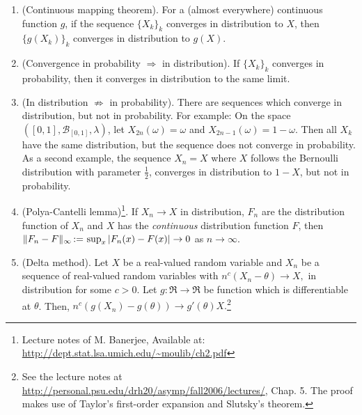 \documentclass[a4paper,10pt]{scrbook}
\begin{document}
\begin{enumerate}
\item (Continuous mapping theorem). For a (almost everywhere) continuous function $g$, if the sequence $\{X_k\}_k$ 
      converges in distribution to $X$, then $\{g(X_k)\}_k$ converges in distribution to 
      $g(X)$.
      
\item (Convergence in probability $\Rightarrow$ in distribution). If $\{X_k\}_k$ converges in probability,
      then it converges in distribution to the same limit.
      
\item (In distribution $\not\Rightarrow$ in probability). There are sequences which converge in distribution,
      but not in probability. For example: On the space $([0,1], \mathcal{B}_{[0,1]},\lambda)$, let $X_{2n}(\omega)=\omega$
      and $X_{2n-1}(\omega) = 1-\omega$. Then all $X_k$ have the same distribution, but the sequence does not 
      converge in probability. As a second example, the sequence $X_n=X$ where $X$ follows the Bernoulli distribution
      with parameter $\frac{1}{2}$, converges in distribution to $1-X$, but not in probability.
      
\item (Polya-Cantelli lemma)\footnote{Lecture notes of M. Banerjee, Available at: \url{http://dept.stat.lsa.umich.edu/~moulib/ch2.pdf}}. If $X_n\to X$ in distribution, $F_n$ are the distribution function of $X_n$ and 
      $X$ has the \textit{continuous} distribution function $F$, then $\|F_n - F\|_\infty {}\mathop{\mathrel{:}=}{} \sup_{x}|F_n(x) - F(x)| \to 0$
      as $n\to\infty$.
      
\item (Delta method). Let \(X\) be a real-valued random variable and 
\(X_n\) be a sequence of real-valued random variables with 
\(
      n^c (X_n - \theta) \to X,
\)
in distribution for some $c>0$. 
Let $g:\Re\to\Re$ be function which is differentiable at $\theta$. Then,
\(
      n^c(g(X_n) - g(\theta)) \to g'(\theta)X.
\)\footnote{See the lecture notes at \url{http://personal.psu.edu/drh20/asymp/fall2006/lectures/}, Chap. 5.
 The proof makes use of Taylor's first-order expansion and Slutsky's theorem.}
\end{enumerate}
\end{document}
